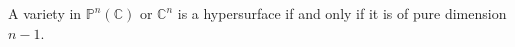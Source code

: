 A variety in $\mathbb{P}^n(\mathbb{C})$ or $\mathbb{C}^n$ is a hypersurface if and only if it is of pure dimension $n-1$.
